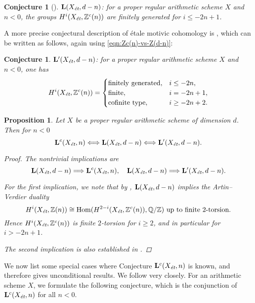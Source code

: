 \documentclass[leqno,12pt]{article}
\theoremstyle{plain}
\newtheorem{proposition}[theorem]{\indent\sc Proposition}
\newtheorem{conjecture}[theorem]{\indent\sc Conjecture}
\theoremstyle{definition}
\DeclareMathOperator{\Hom}{Hom}
\newcommand{\QQ}{\mathbb{Q}}
\newcommand{\ZZ}{\mathbb{Z}}
\newcommand{\et}{\text{\it \'{e}t}}
\begin{document}
\begin{conjecture}[{\cite[Conjecture~3.2; Lemma~3.3]{Flach-Morin-2018}}]
  $\mathbf{L} (X_\et, d-n)$: for a proper regular arithmetic scheme $X$ and
  $n < 0$, the groups $H^i (X_\et, \ZZ^c (n))$ are finitely generated for
  $i \le -2n+1$.
\end{conjecture}

A more precise conjectural description of \'{e}tale motivic cohomology is
\cite[Conjecture~4.12]{Geisser-2017}, which can be written as follows, again
using \eqref{eqn:Zc(n)-vs-Z(d-n)}:

\begin{conjecture}
  $\mathbf{L}' (X_\et, d-n)$: for a proper regular arithmetic scheme $X$ and
  $n < 0$, one has
  \[ H^i (X_\et, \ZZ^c (n)) = \begin{cases}
      \text{finitely generated}, & i \le -2n, \\
      \text{finite}, & i = -2n + 1, \\
      \text{cofinite type}, & i \ge -2n + 2.
    \end{cases} \]
\end{conjecture}

\begin{proposition}
  \label{prop:Lc-Xet-n-vs-L-Xet-d-n}
  Let $X$ be a proper regular arithmetic scheme of dimension $d$.
  Then for $n < 0$
  \[ \mathbf{L}^c (X_\et, n) \Longleftrightarrow
    \mathbf{L} (X_\et, d-n) \Longleftrightarrow
    \mathbf{L}' (X_\et, d-n). \]

  \begin{proof}
    The nontrivial implications are
    \[
      \mathbf{L} (X_\et, d-n) \Longrightarrow \mathbf{L}^c (X_\et, n),
      \quad
      \mathbf{L} (X_\et, d-n) \Longrightarrow \mathbf{L}' (X_\et, d-n).
    \]

    For the first implication, we note that by
    \cite[Proposition~3.4]{Flach-Morin-2018}, $\mathbf{L} (X_\et, d-n)$ implies
    the Artin--Verdier duality
    \[ H^i (X_\et, \ZZ (n)) \cong \Hom (H^{2-i} (X_\et, \ZZ^c (n)), \QQ/\ZZ)
      \text{ up to finite }2\text{-torsion}. \]
    Hence $H^i (X_\et, \ZZ^c (n))$ is finite $2$-torsion for $i \ge 2$, and in
    particular for $i > -2n + 1$.

    The second implication is also established in
    \cite[Proposition~3.4]{Flach-Morin-2018}.
  \end{proof}
\end{proposition}

We now list some special cases where Conjecture $\mathbf{L}^c (X_\et,n)$ is
known, and therefore gives unconditional results. We follow
\cite[\S 5]{Morin-2014} very closely. For an arithmetic scheme $X$, we formulate
the following conjecture, which is the conjunction of $\mathbf{L}^c (X_\et,n)$
for all $n < 0$.
\end{document}
